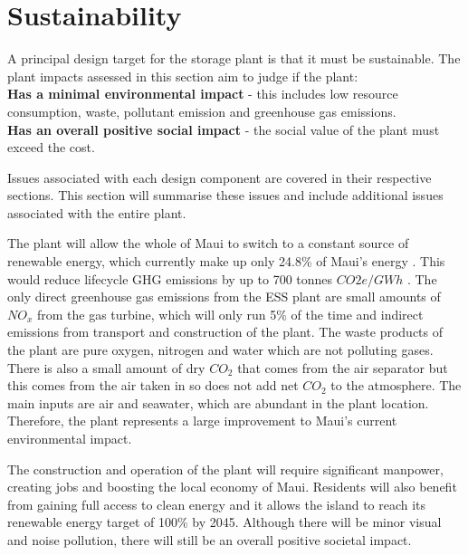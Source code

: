 \documentclass[11pt, oneside]{article}
\begin{document}
\section{Sustainability}

A principal design target for the storage plant is that it must be sustainable. The plant impacts assessed in this section aim to judge if the plant:
\\ \textbf{Has a minimal environmental impact} - this includes low resource consumption, waste, pollutant emission and greenhouse gas emissions.
\\ \textbf{Has an overall positive social impact} - the social value of the plant must exceed the cost.

Issues associated with each design component are covered in their respective sections. This section will summarise these issues and include additional issues associated with the entire plant.

The plant will allow the whole of Maui to switch to a constant source of renewable energy, which currently make up only 24.8\% of Maui's energy \cite{website:mauielectric}. This would reduce lifecycle GHG emissions by up to 700 tonnes $CO2e/GWh$ \cite{GHG}. The only direct greenhouse gas emissions from the ESS plant are small amounts of $NO_x$ from the gas turbine, which will only run 5\% of the time and indirect emissions from transport and construction of the plant. The waste products of the plant are pure oxygen, nitrogen and water which are not polluting gases. There is also a small amount of dry $CO_2$ that comes from the air separator but this comes from the air taken in so does not add net $CO_2$ to the atmosphere. The main inputs are air and seawater, which are abundant in the plant location. Therefore, the plant represents a large improvement to Maui's current environmental impact.

The construction and operation of the plant will require significant manpower, creating jobs and boosting the local economy of Maui. Residents will also benefit from gaining full access to clean energy and it allows the island to reach its renewable energy target of 100\% by 2045.\cite{website:hcei} Although there will be minor visual and noise pollution, there will still be an overall positive societal impact.



\end{document}
